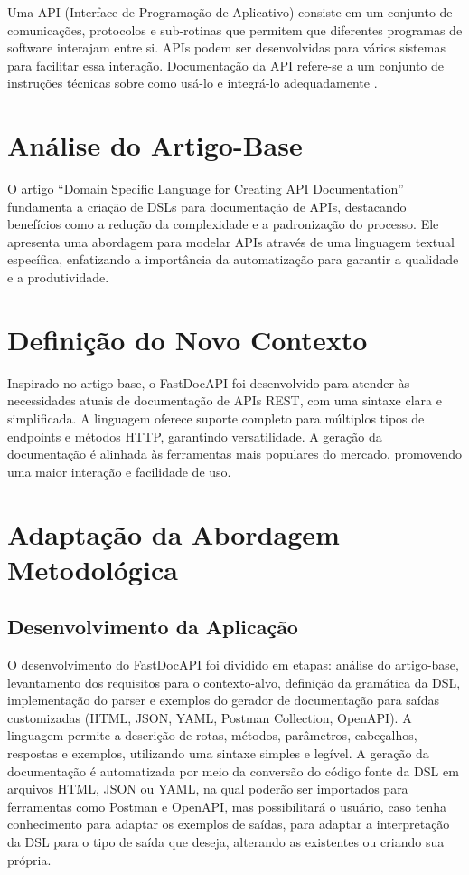 \documentclass[conference]{IEEEtran}
\begin{document}
Uma API (Interface de Programação de Aplicativo) consiste em um conjunto de comunicações,
protocolos e sub-rotinas que permitem que diferentes programas de software interajam entre si. APIs podem ser desenvolvidas para vários sistemas para facilitar essa interação. Documentação da API refere-se a um conjunto de instruções técnicas sobre como usá-lo e integrá-lo adequadamente \cite{geeksforgeeksAPI}.

\section{Análise do Artigo-Base}
O artigo “Domain Specific Language for Creating API Documentation” \cite{martiniuc2024} fundamenta a criação de DSLs para documentação de APIs, destacando benefícios como a redução da complexidade e a padronização do processo. Ele apresenta uma abordagem para modelar APIs através de uma linguagem textual específica, enfatizando a importância da automatização para garantir a qualidade e a produtividade.

\section{Definição do Novo Contexto}
Inspirado no artigo-base, o FastDocAPI foi desenvolvido para atender às necessidades atuais de documentação de APIs REST, com uma sintaxe clara e simplificada. A linguagem oferece suporte completo para múltiplos tipos de endpoints e métodos HTTP, garantindo versatilidade. A geração da documentação é alinhada às ferramentas mais populares do mercado, promovendo uma maior interação e facilidade de uso.

\section{Adaptação da Abordagem Metodológica}

\subsection{Desenvolvimento da Aplicação}
O desenvolvimento do FastDocAPI foi dividido em etapas: análise do artigo-base, levantamento dos requisitos para o contexto-alvo, definição da gramática da DSL, implementação do parser e exemplos do gerador de documentação para saídas customizadas (HTML, JSON, YAML, Postman Collection, OpenAPI). A linguagem permite a descrição de rotas, métodos, parâmetros, cabeçalhos, respostas e exemplos, utilizando uma sintaxe simples e legível. A geração da documentação é automatizada por meio da conversão do código fonte da DSL em arquivos HTML, JSON ou YAML, na qual poderão ser importados para ferramentas como Postman e OpenAPI, mas possibilitará o usuário, caso tenha conhecimento para adaptar os exemplos de saídas, para adaptar a interpretação da DSL para o tipo de saída que deseja, alterando as existentes ou criando sua própria.
\end{document}
